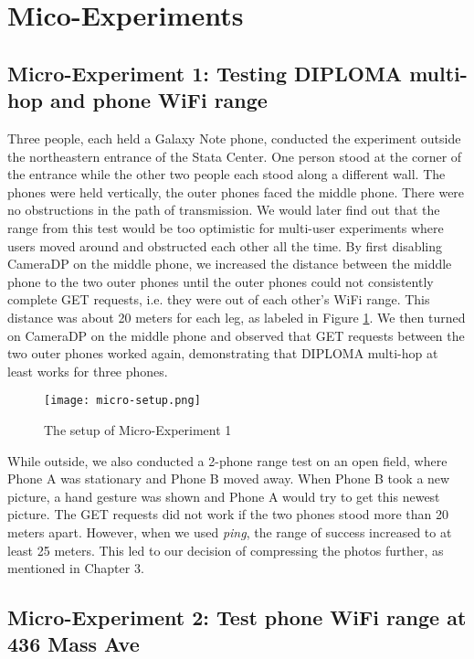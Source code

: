 \section{Mico-Experiments}

\subsection{Micro-Experiment 1: Testing DIPLOMA multi-hop and phone WiFi range}

Three people, each held a Galaxy Note phone, conducted the experiment outside the northeastern entrance of the Stata Center. One person stood at the corner of the entrance while the other two people each stood along a different wall. The phones were held vertically, the outer phones faced the middle phone. There were no obstructions in the path of transmission. We would later find out that the range from this test would be too optimistic for multi-user experiments where users moved around and obstructed each other all the time. By first disabling CameraDP on the middle phone, we increased the distance between the middle phone to the two outer phones until the outer phones could not consistently complete GET requests, i.e. they were out of each other's WiFi range. This distance was about 20 meters for each leg, as labeled in Figure \ref{fig:micro-setup-png}. We then turned on CameraDP on the middle phone and observed that GET requests between the two outer phones worked again, demonstrating that DIPLOMA multi-hop at least works for three phones. 

\begin{figure}[htb]
\begin{center}
\texttt{[image: micro-setup.png]}
\caption{The setup of Micro-Experiment 1}
\label{fig:micro-setup-png}
\end{center}
\end{figure}

While outside, we also conducted a 2-phone range test on an open field, where Phone A was stationary and Phone B moved away. When Phone B took a new picture, a hand gesture was shown and Phone A would try to get this newest picture. The GET requests did not work if the two phones stood more than 20 meters apart. However, when we used {\it ping}, the range of success increased to at least 25 meters. This led to our decision of compressing the photos further, as mentioned in Chapter 3.

\subsection{Micro-Experiment 2: Test phone WiFi range at 436 Mass Ave}


